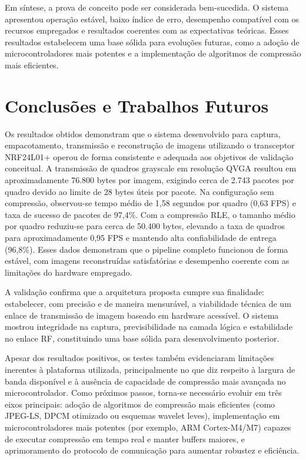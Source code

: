 \documentclass[repeatfields,xlists,xpacks,oneside]{ufrgscca}
\begin{document}
Em síntese, a prova de conceito pode ser considerada bem-sucedida. O sistema apresentou operação estável, baixo índice de erro, desempenho compatível com os recursos empregados e resultados coerentes com as expectativas teóricas. Esses resultados estabelecem uma base sólida para evoluções futuras, como a adoção de microcontroladores mais potentes e a implementação de algoritmos de compressão mais eficientes.








\chapter{Conclusões e Trabalhos Futuros}

Os resultados obtidos demonstram que o sistema desenvolvido para captura, empacotamento, transmissão e reconstrução de imagens utilizando o transceptor NRF24L01+ operou de forma consistente e adequada aos objetivos de validação conceitual. A transmissão de quadros grayscale em resolução QVGA resultou em aproximadamente 76.800 bytes por imagem, exigindo cerca de 2.743 pacotes por quadro devido ao limite de 28 bytes úteis por pacote. Na configuração sem compressão, observou-se tempo médio de 1,58 segundos por quadro (0,63 FPS) e taxa de sucesso de pacotes de 97,4\%. Com a compressão RLE, o tamanho médio por quadro reduziu-se para cerca de 50.400 bytes, elevando a taxa de quadros para aproximadamente 0,95 FPS e mantendo alta confiabilidade de entrega (96,8\%). Esses dados demonstram que o pipeline completo funcionou de forma estável, com imagens reconstruídas satisfatórias e desempenho coerente com as limitações do hardware empregado.

A validação confirma que a arquitetura proposta cumpre sua finalidade: estabelecer, com precisão e de maneira mensurável, a viabilidade técnica de um enlace de transmissão de imagem baseado em hardware acessível. O sistema mostrou integridade na captura, previsibilidade na camada lógica e estabilidade no enlace RF, constituindo uma base sólida para desenvolvimento posterior.

Apesar dos resultados positivos, os testes também evidenciaram limitações inerentes à plataforma utilizada, principalmente no que diz respeito à largura de banda disponível e à ausência de capacidade de compressão mais avançada no microcontrolador. Como próximos passos, torna-se necessário evoluir em três eixos principais: adoção de algoritmos de compressão mais eficientes (como JPEG-LS, DPCM otimizado ou esquemas wavelet leves), implementação em microcontroladores mais potentes (por exemplo, ARM Cortex-M4/M7) capazes de executar compressão em tempo real e manter buffers maiores, e aprimoramento do protocolo de comunicação para aumentar robustez e eficiência.
\end{document}
